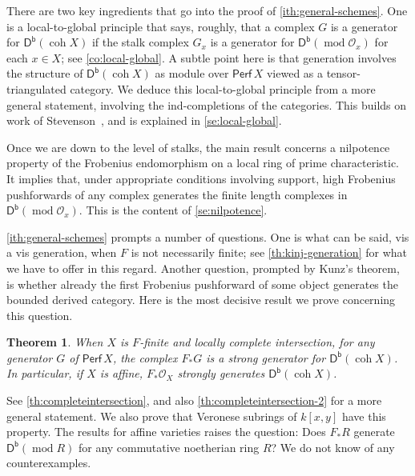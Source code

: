 \documentclass{amsart}
\newcommand{\perf}[1]{\mathsf{Perf}\,#1}
\newcommand{\coh}{\operatorname{coh}}
\newcommand{\dbcat}[1]{\cat{D}^{\mathsf{b}}(#1)}
\newcommand{\mco}{\mathcal{O}}
\newcommand{\cat}[1]{{\mathsf{#1}}}
\newcommand{\rmod}{\operatorname{mod}}
\newcounter{intro}
\newtheorem{introthm}[intro]{Theorem}
\theoremstyle{definition}
\theoremstyle{remark}
\numberwithin{equation}{subsection}
\begin{document}
There are two key ingredients that go into the proof of \cref{ith:general-schemes}. One is a local-to-global principle that says, roughly, that a complex $G$ is a generator for $\dbcat{\coh X}$ if the stalk complex $G_x$ is a generator for $\dbcat{\rmod \mco_x}$ for each $x\in X$; see \cref{co:local-global}. A subtle point here is that generation involves the structure of $\dbcat{\coh X}$ as module over $\perf X$ viewed as a tensor-triangulated category. We deduce this local-to-global principle from a more general statement, involving the ind-completions of the categories. This builds on work of Stevenson~\cite{Stevenson:2013a}, and is explained in \cref{se:local-global}.

Once we are down to the level of stalks, the main result concerns a nilpotence property of the Frobenius endomorphism on a local ring of prime characteristic. It implies that, under appropriate conditions involving support, high Frobenius pushforwards of any complex generates the finite length complexes in $\dbcat{\rmod \mco_x}$. This is the content of \cref{se:nilpotence}.

\cref{ith:general-schemes} prompts a number of questions. One is what can be said, vis a vis generation, when $F $ is not necessarily finite; see \cref{th:kinj-generation} for what we have to offer in this regard. Another question, prompted by Kunz's theorem, is whether already the first Frobenius pushforward of some object generates the bounded derived category. Here is the most decisive result we prove concerning this question. 

\begin{introthm}
 \label{ith:completeintersection}
When $X$ is $F$-finite and locally complete intersection, for any generator $G$ of $\perf X$, the complex $F_*G$ is a strong generator for $\dbcat{\coh X}$. In particular, if $X$ is affine, $F_*\mco_X$ strongly generates $\dbcat{\coh X}$.
\end{introthm}

See \cref{th:completeintersection}, and also \cref{th:completeintersection-2} for a more general statement. We also prove that Veronese subrings of $k[x,y]$ have this property. The results for affine varieties raises the question: Does $F_{*}R$ generate $\dbcat{\rmod R}$ for any commutative noetherian ring $R$? We do not know of any counterexamples. 
\end{document}
